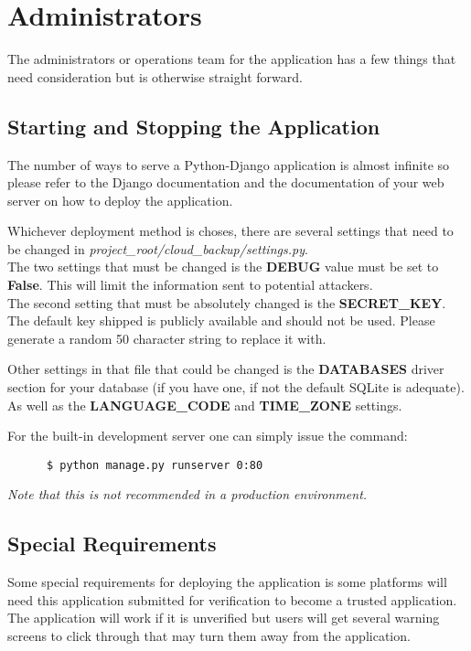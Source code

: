 \documentclass{article}
\begin{document}
    \section{Administrators}
    The administrators or operations team for the application has a few things that need consideration but is otherwise straight forward.

      \subsection{Starting and Stopping the Application}
      The number of ways to serve a Python-Django application is almost infinite so please refer to the Django documentation and the documentation of your web server on how to deploy the application.

      Whichever deployment method is choses, there are several settings that need to be changed in \textit{project\_root/cloud\_backup/settings.py}. \\
      The two settings that must be changed is the \textbf{DEBUG} value must be set to \textbf{False}. This will limit the information sent to potential attackers. \\
      The second setting that must be absolutely changed is the \textbf{SECRET\_KEY}. The default key shipped is publicly available and should not be used. Please generate a random 50 character string to replace it with.

      Other settings in that file that could be changed is the \textbf{DATABASES} driver section for your database (if you have one, if not the default SQLite is adequate). As well as the \textbf{LANGUAGE\_CODE} and
      \textbf{TIME\_ZONE} settings.

      For the built-in development server one can simply issue the command:
      \begin{verbatim}
      $ python manage.py runserver 0:80
      \end{verbatim}

      \textit{Note that this is not recommended in a production environment.}

      \subsection{Special Requirements}
      Some special requirements for deploying the application is some platforms will need this application submitted for verification to become a trusted application. The application will work if it is unverified but users will
      get several warning screens to click through that may turn them away from the application.
\end{document}
